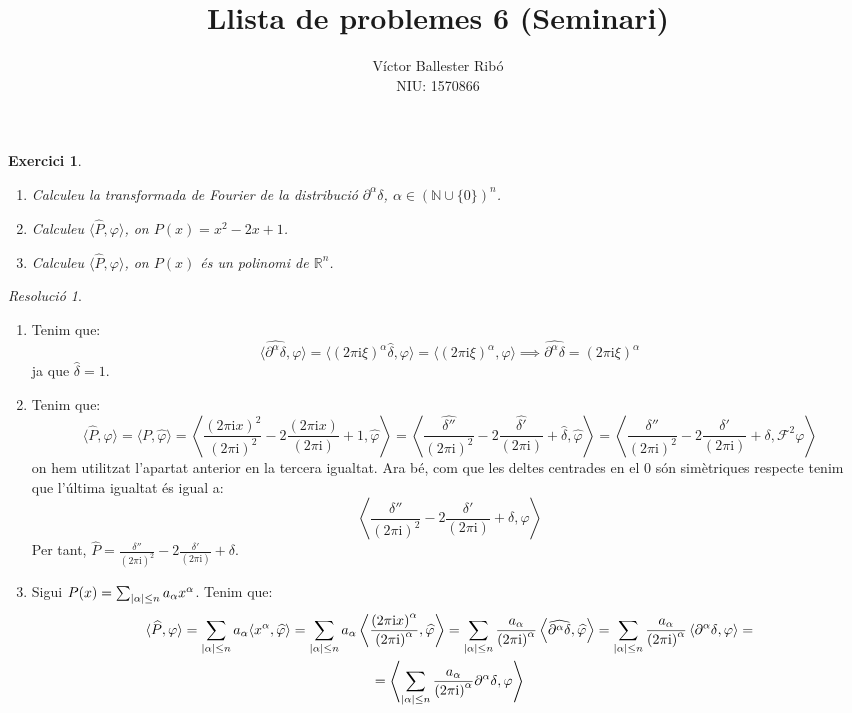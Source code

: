 \documentclass[10pt,a4paper]{article}
\title{\bfseries\Large Llista de problemes 6 (Seminari)}
\author{Víctor Ballester Ribó\\NIU: 1570866}
\date{\parbox{\linewidth}{\centering
  Anàlisi Harmònica\endgraf
  Grau en Matemàtiques\endgraf
  Universitat Autònoma de Barcelona\endgraf
  Maig de 2023}}
\newcommand{\NN}{\ensuremath{\mathbb{N}}} %
\newcommand{\RR}{\ensuremath{\mathbb{R}}} %
\newcommand{\ii}{\mathrm{i}} %
\newtheorem{exercici}{Exercici}
\theoremstyle{definition}
\theoremstyle{remark}
\newtheorem*{res}{Resolució}
\newcommand{\F}{\mathcal{F}} %
\begin{document}
\maketitle
\begin{exercici}\hfill
  \begin{enumerate}
    \item Calculeu la transformada de Fourier de la distribució $\partial^\alpha\delta$, $\alpha\in{(\NN\cup\{0\})}^n$.
    \item Calculeu $\langle \widehat{P},\varphi\rangle $, on $P(x)=x^2-2x +1$.
    \item Calculeu $\langle \widehat{P},\varphi\rangle $, on $P(x)$ és un polinomi de $\RR^n$.
  \end{enumerate}
\end{exercici}
\begin{res}\hfill
  \begin{enumerate}
    \item Tenim que:
          $$
            \langle \widehat{\partial^\alpha\delta}, \varphi\rangle = \langle {(2\pi\ii\xi)}^\alpha\widehat\delta, {\varphi}\rangle = \langle {(2\pi\ii\xi)}^\alpha, {\varphi}\rangle\implies\widehat{\partial^\alpha\delta}= {(2\pi\ii\xi)}^\alpha
          $$
          ja que $\widehat{\delta}=1$.
    \item Tenim que:
          $$
            \langle \widehat{P},\varphi\rangle = \langle P,\widehat{\varphi}\rangle = \left\langle \frac{{(2\pi\ii x)}^2}{{(2\pi\ii)}^2}-2\frac{{(2\pi\ii x)}}{{(2\pi\ii)}}+1,\widehat\varphi \right\rangle =\left\langle \frac{\widehat{\delta''}}{{(2\pi\ii)}^2}-2\frac{\widehat{\delta'}}{{(2\pi\ii)}}+\widehat\delta,\widehat\varphi \right\rangle=\left\langle \frac{{\delta''}}{{(2\pi\ii)}^2}-2\frac{{\delta'}}{{(2\pi\ii)}}+\delta,\F^2\varphi \right\rangle
          $$
          on hem utilitzat l'apartat anterior en la tercera igualtat. Ara bé, com que les deltes centrades en el 0 són simètriques respecte tenim que l'última igualtat és igual a:
          $$
            \left\langle \frac{{\delta''}}{{(2\pi\ii)}^2}-2\frac{{\delta'}}{{(2\pi\ii)}}+\delta,\varphi \right\rangle
          $$
          Per tant, $\widehat{P}= \frac{{\delta''}}{{(2\pi\ii)}^2}-2\frac{{\delta'}}{{(2\pi\ii)}}+\delta$.
    \item Sigui $P(x)=\sum_{\abs{\alpha}\leq n}a_\alpha x^\alpha$. Tenim que:
          \begin{multline*}
            \langle\widehat{P}, \varphi\rangle=\sum_{\abs{\alpha}\leq n}a_\alpha \langle x^\alpha, \widehat{\varphi}\rangle=\sum_{\abs{\alpha}\leq n}a_\alpha \left\langle \frac{{(2\pi\ii x)}^\alpha}{{(2\pi\ii)}^\alpha}, \widehat\varphi\right\rangle=\sum_{\abs{\alpha}\leq n}\frac{a_\alpha}{{(2\pi\ii)}^\alpha} \left\langle \widehat{\partial^\alpha\delta}, \widehat\varphi\right\rangle=\sum_{\abs{\alpha}\leq n}\frac{a_\alpha}{{(2\pi\ii)}^\alpha} \left\langle {\partial^\alpha\delta},\varphi\right\rangle=\\=\left\langle \sum_{\abs{\alpha}\leq n}\frac{a_\alpha}{{(2\pi\ii)}^\alpha} {\partial^\alpha\delta},\varphi\right\rangle

\end{multline*}
\end{enumerate}
\end{res}
\end{document}
